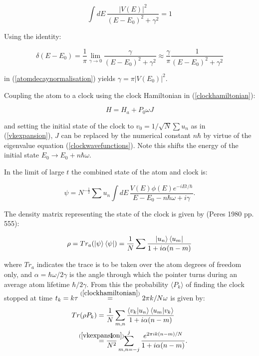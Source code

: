 \documentclass{article}
\begin{document}
\begin{equation}
	\int dE\,\frac{|V(E)|^2}{(E-E_0)^2+\gamma^2}=1
	\label{atomdecaynormalisation}
\end{equation}

\noindent Using the identity:

\begin{equation}
	\delta(E-E_0) = \frac{1}{\pi} \lim_{\gamma\to 0}\frac{\gamma}{(E-E_0)^2+\gamma^2} \approx \frac{\gamma}{\pi} \frac{1}{(E-E_0)^2+\gamma^2}
\end{equation}

\noindent in (\ref{atomdecaynormalisation}) yields $\gamma = \pi|V(E_0)|^2$.

\noindent Coupling the atom to a clock using the clock Hamiltonian in (\ref{clockhamiltonian}):

\begin{equation}
	H = H_a+P_0\omega J
\end{equation}

\noindent and setting the initial state of the clock to $v_0 = 1/\sqrt{N}\sum u_n$ as in (\ref{vkexpansion}), $J$ can be replaced by the numerical constant $n\hbar$ by virtue of the eigenvalue equation (\ref{clockwavefunctions}). Note this shifts the energy of the initial state $E_0 \rightarrow E_0 + n\hbar\omega$.

\noindent In the limit of large $t$ the combined state of the atom and clock is:

\begin{equation}
	\psi = N^{-\frac{1}{2}}\sum u_n \int dE \, \frac{V(E)\phi(E)e^{-iEt/\hbar}}{E-E_0-n\hbar\omega+i\gamma}.
\end{equation}

\noindent The density matrix representing the state of the clock is given by (Peres 1980 pp. 555):

\begin{equation}
	\rho = Tr_a(\ket{\psi}\bra{\psi}) = \frac{1}{N}\sum \frac{\ket{u_n}\bra{u_m}}{1+i\alpha(n-m)}
\end{equation}

\noindent where $Tr_a$ indicates the trace is to be taken over the atom degrees of freedom only, and $\alpha = \hbar\omega/2\gamma$ is the angle through which the pointer turns during an average atom lifetime $\hbar/2\gamma$. From this the probability $\langle P_k \rangle$ of finding the clock stopped at time $t_k = k\tau \stackrel{(\ref{clockhamiltonian})}{=} 2\pi k/N\omega$ is given by:
\begin{subequations}
\begin{align}
	Tr(\rho P_k) &= \frac{1}{N}\sum_{m,n} \frac{\braket{v_k|u_n}\braket{u_m|v_k}}{1+i\alpha(n-m)} \\
		     &\stackrel{\mathclap{(\ref{vkexpansion})}}{=} \frac{1}{N^2}\sum_{m,n=-j}^j \frac{e^{2\pi ik(n-m)/N}}{1+i\alpha(n-m)}.
\end{align}
\end{subequations}
\end{document}
